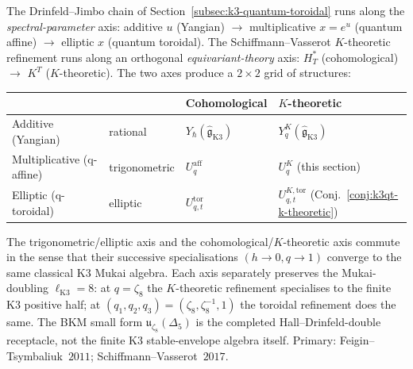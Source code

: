 \begin{remark}
\label{rem:k3qt-orthogonal-refinements}
The Drinfeld--Jimbo chain of
Section~\ref{subsec:k3-quantum-toroidal}
runs along the \emph{spectral-parameter} axis: additive
$u$ (Yangian) $\to$ multiplicative $x = e^u$ (quantum affine) $\to$
elliptic $x$ (quantum toroidal). The Schiffmann--Vasserot $K$-theoretic
refinement runs along an orthogonal \emph{equivariant-theory} axis:
$H^*_T$ (cohomological) $\to$ $K^T$ ($K$-theoretic). The two axes
produce a $2 \times 2$ grid of structures:
\begin{center}
\small
\begin{tabular}{ll|ll}
\toprule
 & & Cohomological & $K$-theoretic \\
\midrule
Additive (Yangian) & rational & $Y_\hbar(\widehat{\mathfrak{g}}_{\mathrm{K3}})$ & $Y^K_q(\widehat{\mathfrak{g}}_{\mathrm{K3}})$ \\
Multiplicative (q-affine) & trigonometric & $U_q^{\mathrm{aff}}$ & $U^K_q$ (this section) \\
Elliptic (q-toroidal) & elliptic & $U_{q, t}^{\mathrm{tor}}$ & $U^{K, \mathrm{tor}}_{q, t}$ (Conj.~\ref{conj:k3qt-k-theoretic}) \\
\bottomrule
\end{tabular}
\end{center}
The trigonometric/elliptic axis and the cohomological/$K$-theoretic
axis commute in the sense that their successive specialisations
$(h \to 0, q \to 1)$ converge to the same classical $\mathrm{K3}$
Mukai algebra. Each axis separately preserves the Mukai-doubling
$\ell_{\mathrm{K3}}=8$: at $q=\zeta_8$ the $K$-theoretic refinement
specialises to the finite K3 positive half; at
$(q_1,q_2,q_3)=(\zeta_8,\zeta_8^{-1},1)$ the toroidal refinement does
the same. The BKM small form $\mathfrak u_{\zeta_8}(\Delta_5)$ is the
completed Hall--Drinfeld-double receptacle, not the finite K3
stable-envelope algebra itself.
Primary: Feigin--Tsymbaliuk~$2011$; Schiffmann--Vasserot~$2017$.
\end{remark}

